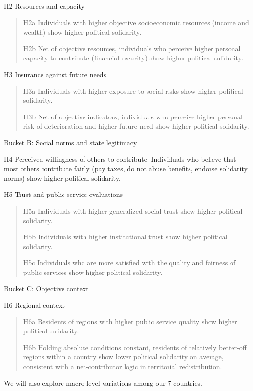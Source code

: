 \documentclass[12pt]{article}
\begin{document}
H2 Resources and capacity

\begin{quote}
H2a Individuals with higher objective socioeconomic resources (income
and wealth) show higher political solidarity.

H2b Net of objective resources, individuals who perceive higher personal
capacity to contribute (financial security) show higher political
solidarity.
\end{quote}

H3 Insurance against future needs

\begin{quote}
H3a Individuals with higher exposure to social risks show higher
political solidarity.

H3b Net of objective indicators, individuals who perceive higher
personal risk of deterioration and higher future need show higher
political solidarity.
\end{quote}

Bucket B: Social norms and state legitimacy

H4 Perceived willingness of others to contribute: Individuals who
believe that most others contribute fairly (pay taxes, do not abuse
benefits, endorse solidarity norms) show higher political solidarity.

H5 Trust and public-service evaluations

\begin{quote}
H5a Individuals with higher generalized social trust show higher
political solidarity.

H5b Individuals with higher institutional trust show higher political
solidarity.

H5c Individuals who are more satisfied with the quality and fairness of
public services show higher political solidarity.
\end{quote}

Bucket C: Objective context

H6 Regional context

\begin{quote}
H6a Residents of regions with higher public service quality show higher
political solidarity.

H6b Holding absolute conditions constant, residents of relatively
better-off regions within a country show lower political solidarity on
average, consistent with a net-contributor logic in territorial
redistribution.
\end{quote}

We will also explore macro-level variations among our 7 countries.
\end{document}
